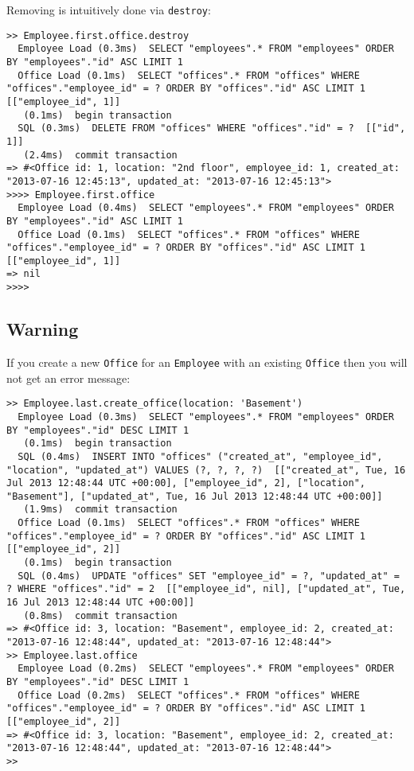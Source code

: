 \documentclass[a4paper]{book}
\begin{document}
Removing is intuitively done via \texttt{destroy}:

\begin{shaded}\begin{verbatim}
>> Employee.first.office.destroy
  Employee Load (0.3ms)  SELECT "employees".* FROM "employees" ORDER BY "employees"."id" ASC LIMIT 1
  Office Load (0.1ms)  SELECT "offices".* FROM "offices" WHERE "offices"."employee_id" = ? ORDER BY "offices"."id" ASC LIMIT 1  [["employee_id", 1]]
   (0.1ms)  begin transaction
  SQL (0.3ms)  DELETE FROM "offices" WHERE "offices"."id" = ?  [["id", 1]]
   (2.4ms)  commit transaction
=> #<Office id: 1, location: "2nd floor", employee_id: 1, created_at: "2013-07-16 12:45:13", updated_at: "2013-07-16 12:45:13">
>>>> Employee.first.office
  Employee Load (0.4ms)  SELECT "employees".* FROM "employees" ORDER BY "employees"."id" ASC LIMIT 1
  Office Load (0.1ms)  SELECT "offices".* FROM "offices" WHERE "offices"."employee_id" = ? ORDER BY "offices"."id" ASC LIMIT 1  [["employee_id", 1]]
=> nil
>>>>
\end{verbatim}\end{shaded}

\subsection{Warning}\label{warning-4}

If you create a new \texttt{Office} for an \texttt{Employee} with an existing \texttt{Office} then you will not get an error message:

\begin{shaded}\begin{verbatim}
>> Employee.last.create_office(location: 'Basement')
  Employee Load (0.3ms)  SELECT "employees".* FROM "employees" ORDER BY "employees"."id" DESC LIMIT 1
   (0.1ms)  begin transaction
  SQL (0.4ms)  INSERT INTO "offices" ("created_at", "employee_id", "location", "updated_at") VALUES (?, ?, ?, ?)  [["created_at", Tue, 16 Jul 2013 12:48:44 UTC +00:00], ["employee_id", 2], ["location", "Basement"], ["updated_at", Tue, 16 Jul 2013 12:48:44 UTC +00:00]]
   (1.9ms)  commit transaction
  Office Load (0.1ms)  SELECT "offices".* FROM "offices" WHERE "offices"."employee_id" = ? ORDER BY "offices"."id" ASC LIMIT 1  [["employee_id", 2]]
   (0.1ms)  begin transaction
  SQL (0.4ms)  UPDATE "offices" SET "employee_id" = ?, "updated_at" = ? WHERE "offices"."id" = 2  [["employee_id", nil], ["updated_at", Tue, 16 Jul 2013 12:48:44 UTC +00:00]]
   (0.8ms)  commit transaction
=> #<Office id: 3, location: "Basement", employee_id: 2, created_at: "2013-07-16 12:48:44", updated_at: "2013-07-16 12:48:44">
>> Employee.last.office
  Employee Load (0.2ms)  SELECT "employees".* FROM "employees" ORDER BY "employees"."id" DESC LIMIT 1
  Office Load (0.2ms)  SELECT "offices".* FROM "offices" WHERE "offices"."employee_id" = ? ORDER BY "offices"."id" ASC LIMIT 1  [["employee_id", 2]]
=> #<Office id: 3, location: "Basement", employee_id: 2, created_at: "2013-07-16 12:48:44", updated_at: "2013-07-16 12:48:44">
>>
\end{verbatim}\end{shaded}
\end{document}
